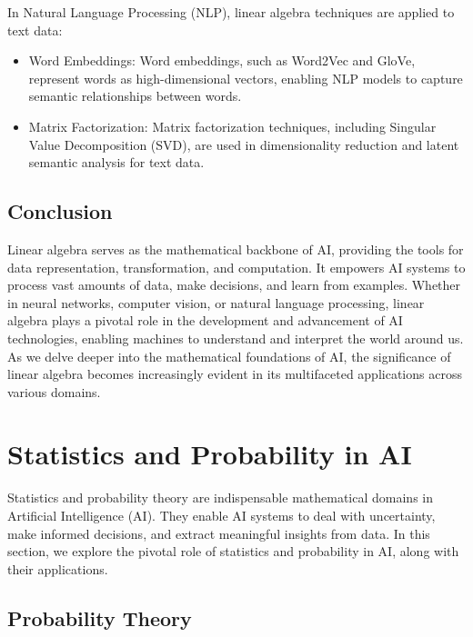 \documentclass[conference]{IEEEtran}
\begin{document}
In Natural Language Processing (NLP), linear algebra techniques are applied to text data:
\begin{itemize}
  \item Word Embeddings: Word embeddings, such as Word2Vec and GloVe, represent words as high-dimensional vectors, enabling NLP models to capture semantic relationships between words.

  \item Matrix Factorization: Matrix factorization techniques, including Singular Value Decomposition (SVD), are used in dimensionality reduction and latent semantic analysis for text data.
\end{itemize}

\subsection{Conclusion}

Linear algebra serves as the mathematical backbone of AI, providing the tools for data representation, transformation, and computation. It empowers AI systems to process vast amounts of data, make decisions, and learn from examples. Whether in neural networks, computer vision, or natural language processing, linear algebra plays a pivotal role in the development and advancement of AI technologies, enabling machines to understand and interpret the world around us. As we delve deeper into the mathematical foundations of AI, the significance of linear algebra becomes increasingly evident in its multifaceted applications across various domains.

\section{Statistics and Probability in AI}

Statistics and probability theory are indispensable mathematical domains in Artificial Intelligence (AI). They enable AI systems to deal with uncertainty, make informed decisions, and extract meaningful insights from data. In this section, we explore the pivotal role of statistics and probability in AI, along with their applications.

\subsection{Probability Theory}
\end{document}
